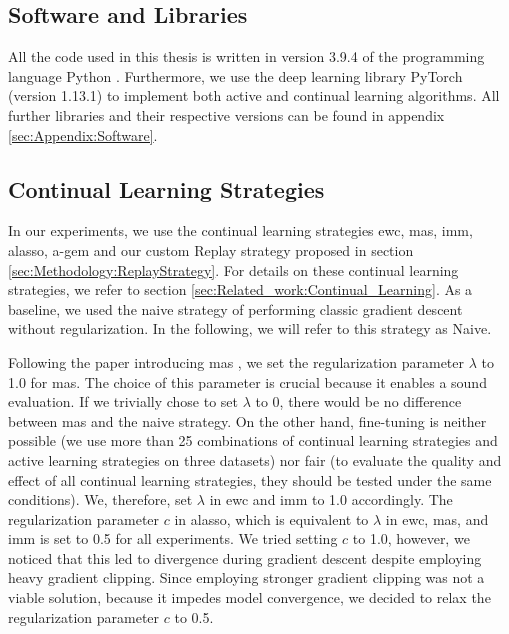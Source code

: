 \subsection{Software and Libraries}
\label{sec:ExperimentSetup:Software}
All the code used in this thesis is written in version 3.9.4 of the programming language Python \cite{Rossum1995Python}. Furthermore, we use the deep
learning library PyTorch \cite{paszke2019pytorch} (version 1.13.1) to implement both active and continual learning algorithms. All further libraries
and their respective versions can be found in appendix \ref{sec:Appendix:Software}.

\subsection{Continual Learning Strategies}
\label{sec:ExperimentSetup:CLStrategies}
In our experiments, we use the continual learning strategies \gls{ewc}, \gls{mas}, \gls{imm}, \gls{alasso}, \gls{a-gem} and our custom Replay strategy
proposed in section \ref{sec:Methodology:ReplayStrategy}. For details on these continual learning strategies, we refer to section 
\ref{sec:Related_work:Continual_Learning}. As a baseline, we used the naive strategy of performing classic gradient descent without 
regularization. In the following, we will refer to this strategy as Naive. \par
Following the paper introducing \gls{mas} \cite{aljundi2018memory}, we set the regularization parameter $\lambda$ to 1.0 for \gls{mas}. The choice of
this parameter is crucial because it enables a sound evaluation. If we trivially chose to set $\lambda$ to 0, there would be no difference between
\gls{mas} and the naive strategy. On the other hand, fine-tuning is neither possible (we use more than 25 combinations of continual learning strategies and
active learning strategies on three datasets) nor fair (to evaluate the quality and effect of all continual learning strategies, they should be tested under
the same conditions). We, therefore, set $\lambda$ in \gls{ewc} and \gls{imm} to 1.0 accordingly.
The regularization parameter $c$ in \gls{alasso}, which is equivalent to $\lambda$ in \gls{ewc}, \gls{mas}, and \gls{imm} is set to 0.5 for all experiments.
We tried setting $c$ to 1.0, however, we noticed that this led to divergence during gradient descent despite employing heavy gradient clipping. Since employing
stronger gradient clipping was not a viable solution, because it impedes model convergence, we decided to relax the regularization parameter $c$ to 0.5. \par
